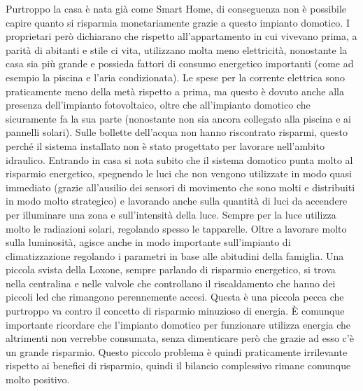 Purtroppo la casa è nata già come Smart Home, di conseguenza non è possibile capire quanto si risparmia monetariamente grazie a questo impianto domotico. I proprietari però dichiarano che rispetto all’appartamento in cui vivevano prima, a parità di abitanti e stile ci vita, utilizzano molta meno elettricità, nonostante la casa sia più grande e possieda fattori di consumo energetico importanti (come ad esempio la piscina e l’aria condizionata). Le spese per la corrente elettrica sono praticamente meno della metà rispetto a prima, ma questo è dovuto anche alla presenza dell’impianto fotovoltaico, oltre che all’impianto domotico che sicuramente fa la sua parte (nonostante non sia ancora collegato alla piscina e ai pannelli solari). Sulle bollette dell’acqua non hanno riscontrato risparmi, questo perché il sistema installato non è stato progettato per lavorare nell’ambito idraulico. 
Entrando in casa si nota subito che il sistema domotico punta molto al risparmio energetico, spegnendo le luci che non vengono utilizzate in modo quasi immediato (grazie all’ausilio dei sensori di movimento che sono molti e distribuiti in modo molto strategico) e lavorando anche sulla quantità di luci da accendere per illuminare una zona e sull’intensità della luce. Sempre per la luce utilizza molto le radiazioni solari, regolando spesso le tapparelle. Oltre a lavorare molto sulla luminosità, agisce anche in modo importante sull’impianto di climatizzazione regolando i parametri in base alle abitudini della famiglia.
Una piccola svista della Loxone, sempre parlando di risparmio energetico, si trova nella centralina e nelle valvole che controllano il riscaldamento che hanno dei piccoli led che rimangono perennemente accesi. Questa è una piccola pecca che purtroppo va contro il concetto di risparmio minuzioso di energia. È comunque importante ricordare che l’impianto domotico per funzionare utilizza energia che altrimenti non verrebbe consumata, senza dimenticare però che grazie ad esso c’è un grande risparmio. Questo piccolo problema è quindi praticamente irrilevante rispetto ai benefici di risparmio, quindi il bilancio complessivo rimane comunque molto positivo.
